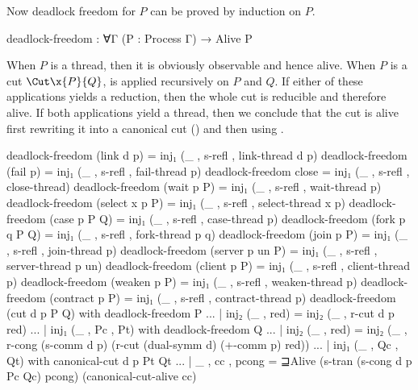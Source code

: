 Now deadlock freedom for $P$ can be proved by induction on $P$.

\begin{code}
deadlock-freedom : ∀{Γ} (P : Process Γ) → Alive P
\end{code}

When $P$ is a thread, then it is obviously observable and hence alive. When $P$
is a cut $\Cut\x{P}{Q}$,  is applied recursively
on $P$ and $Q$. If either of these applications yields a reduction, then the
whole cut is reducible and therefore alive. If both applications yield a thread,
then we conclude that the cut is alive first rewriting it into a canonical cut
() and then using
.

\begin{code}[hide]
deadlock-freedom (link d p) = inj₁ (_ , s-refl , link-thread d p)
deadlock-freedom (fail p) = inj₁ (_ , s-refl , fail-thread p)
deadlock-freedom close = inj₁ (_ , s-refl , close-thread)
deadlock-freedom (wait p P) = inj₁ (_ , s-refl , wait-thread p)
deadlock-freedom (select x p P) = inj₁ (_ , s-refl , select-thread x p)
deadlock-freedom (case p P Q) = inj₁ (_ , s-refl , case-thread p)
deadlock-freedom (fork p q P Q) = inj₁ (_ , s-refl , fork-thread p q)
deadlock-freedom (join p P) = inj₁ (_ , s-refl , join-thread p)
deadlock-freedom (server p un P) = inj₁ (_ , s-refl , server-thread p un)
deadlock-freedom (client p P) = inj₁ (_ , s-refl , client-thread p)
deadlock-freedom (weaken p P) = inj₁ (_ , s-refl , weaken-thread p)
deadlock-freedom (contract p P) = inj₁ (_ , s-refl , contract-thread p)
deadlock-freedom (cut d p P Q) with deadlock-freedom P
... | inj₂ (_ , red) = inj₂ (_ , r-cut d p red)
... | inj₁ (_ , Pc , Pt) with deadlock-freedom Q
... | inj₂ (_ , red) = inj₂ (_ , r-cong (s-comm d p) (r-cut (dual-symm d) (+-comm p) red))
... | inj₁ (_ , Qc , Qt) with canonical-cut d p Pt Qt
... | _ , cc , pcong = ⊒Alive (s-tran (s-cong d p Pc Qc) pcong) (canonical-cut-alive cc)
\end{code}
